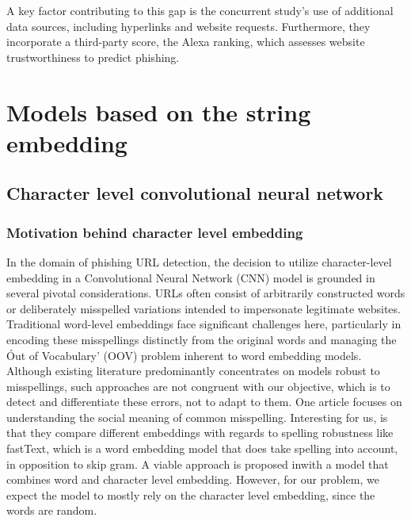 \documentclass{article}
\begin{document}
    A key factor contributing to this gap is the concurrent study's use of additional data sources, including hyperlinks and website requests.
    Furthermore, they incorporate a third-party score, the Alexa ranking, which assesses website trustworthiness to predict phishing.


    \section{Models based on the string embedding}\label{sec:models-based-on-the-string-embedding}

    \subsection{Character level convolutional neural network}\label{subsec:character-level-convolutional-neural-network}

    \subsubsection{Motivation behind character level embedding}

    In the domain of phishing URL detection, the decision to utilize character-level embedding in a Convolutional Neural Network (CNN) model is grounded in several pivotal considerations.
    URLs often consist of arbitrarily constructed words or deliberately misspelled variations intended to impersonate legitimate websites.
    Traditional word-level embeddings face significant challenges here, particularly in encoding these misspellings distinctly from the original words and managing the \'Out of Vocabulary' (OOV) problem inherent to word embedding models.
    Although existing literature predominantly concentrates on models robust to misspellings, such approaches are not congruent with our objective, which is to detect and differentiate these errors, not to adapt to them.
    One article focuses on understanding the social meaning of common misspelling\cite{OOVmispelling}.
    Interesting for us, is that they compare different embeddings with regards to spelling robustness like fastText, which is a word embedding model that does take spelling into account, in opposition to skip gram.
    A viable approach is proposed in\cite{WordCharacterEmbeddings}with a model that combines word and character level embedding.
    However, for our problem, we expect the model to mostly rely on the character level embedding, since the words are random.
\end{document}
